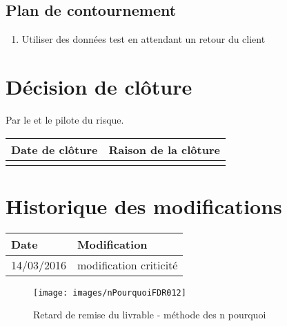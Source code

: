 \flushleft
\subsection*{Plan de contournement}

\begin{enumerate}
	\item Utiliser des données test en attendant un retour du client
\end{enumerate}

\section*{Décision de clôture}
Par le \CP{} et le pilote du risque.
\begin{table}[H]
\centering
	\begin{tabularx}{16.8cm}{|X|X|}
	\hline
	\rowcolor{gray!40} Date de clôture & Raison de la clôture \\
	\hline
	  & \\
	\hline
	\end{tabularx}
\end{table}

\section*{Historique des modifications}
\begin{table}[H]
\centering
	\begin{tabularx}{16.8cm}{|X|X|}
	\hline
	\rowcolor{gray!40} Date & Modification \\
	\hline
	 14/03/2016 & modification criticité\\
	\hline
	\end{tabularx}
\end{table}
\newpage

\begin{figure}
	\centering
	\texttt{[image: images/nPourquoiFDR012]}
	\caption{\label{risque retard de remise du livrable} Retard de remise du livrable - méthode des n pourquoi}
\end{figure}
